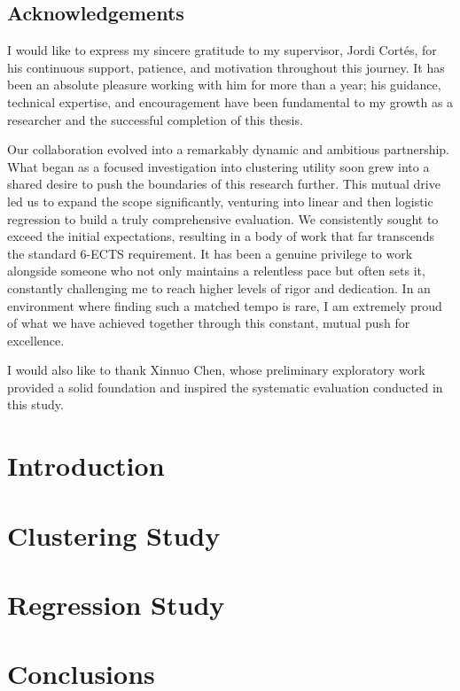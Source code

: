\documentclass[12pt, a4paper, twoside]{report}
\begin{document}
\chapter*{Acknowledgements}
I would like to express my sincere gratitude to my supervisor, Jordi Cort\'es, for his continuous support, patience, and motivation throughout this journey. It has been an absolute pleasure working with him for more than a year; his guidance, technical expertise, and encouragement have been fundamental to my growth as a researcher and the successful completion of this thesis. 

Our collaboration evolved into a remarkably dynamic and ambitious partnership. What began as a focused investigation into clustering utility soon grew into a shared desire to push the boundaries of this research further. This mutual drive led us to expand the scope significantly, venturing into linear and then logistic regression to build a truly comprehensive evaluation. We consistently sought to exceed the initial expectations, resulting in a body of work that far transcends the standard 6-ECTS requirement. It has been a genuine privilege to work alongside someone who not only maintains a relentless pace but often sets it, constantly challenging me to reach higher levels of rigor and dedication. In an environment where finding such a matched tempo is rare, I am extremely proud of what we have achieved together through this constant, mutual push for excellence.

I would also like to thank Xinnuo Chen, whose preliminary exploratory work provided a solid foundation and inspired the systematic evaluation conducted in this study.

\tableofcontents
\listoffigures
\listoftables
\clearpage
\hypersetup{pageanchor=true}


\part{Introduction}


\part{Clustering Study}





\part{Regression Study}






\part{Conclusions}


\printbibliography[title={References}, heading=bibintoc]

\begin{appendices}


\end{appendices}
\end{document}
